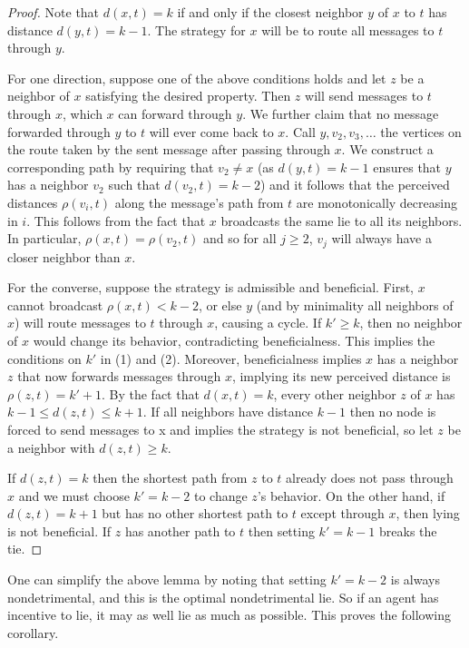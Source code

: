 \documentclass[reprint]{revtex4-1}
\begin{document}
\begin{proof}

Note that $d(x,t) = k$ if and only if the closest neighbor $y$ of $x$ to $t$
has distance $d(y,t) = k-1$. The strategy for $x$ will be to route all messages
to $t$ through $y$.

For one direction, suppose one of the above conditions holds and let $z$ be a
neighbor of $x$ satisfying the desired property. Then $z$ will send messages to
$t$ through $x$, which $x$ can forward through $y$. We further claim that no
message forwarded through $y$ to $t$ will ever come back to $x$. Call $y, v_2,
v_3, \dots$ the vertices on the route taken by the sent message after passing
through $x$. We construct a corresponding path by requiring that $v_2 \neq x$ (as $d(y,t)=k-1$ 
ensures that $y$ has a neighbor $v_{2}$ such that $d(v_{2},t)=k-2$) 
and it follows that the perceived distances $\rho(v_i, t)$ along the message's path from $t$
are monotonically decreasing in $i$. This follows from the fact that $x$
broadcasts the same lie to all its neighbors. In particular, $\rho(x,t) =
\rho(v_2, t)$ and so for all $j \geq 2$, $v_j$ will always have a closer
neighbor than $x$.

For the converse, suppose the strategy is admissible and beneficial. First, $x$
cannot broadcast $\rho(x,t) < k-2$, or else $y$ (and by minimality all
neighbors of $x$) will route messages to $t$ through $x$, causing a cycle. If
$k' \geq k$, then no neighbor of $x$ would change its behavior, contradicting
beneficialness. This implies the conditions on $k'$ in (1) and (2). Moreover,
beneficialness implies $x$ has a neighbor $z$ that now forwards messages
through $x$, implying its new perceived distance is $\rho(z,t) = k' + 1$. By
the fact that $d(x,t) = k$, every other neighbor $z$ of $x$ has $k-1 \leq
d(z,t) \leq k+1$. If all neighbors have distance $k-1$ then no node is forced to send
messages to x and implies the strategy is not beneficial, so let $z$ be a neighbor
with $d(z,t) \geq k$.

If $d(z,t) = k$ then the shortest path from $z$ to $t$ already does not pass
through $x$ and we must choose $k' = k-2$ to change $z$'s behavior. On the
other hand, if $d(z,t) = k+1$ but has no other shortest path to $t$ except
through $x$, then lying is not beneficial. If $z$ has another
path to $t$ then setting $k' = k-1$ breaks the tie.
\end{proof}

One can simplify the above lemma by noting that setting $k' = k-2$ is always
nondetrimental, and this is the optimal nondetrimental lie. So if an agent has
incentive to lie, it may as well lie as much as possible. This proves the
following corollary.
\end{document}
